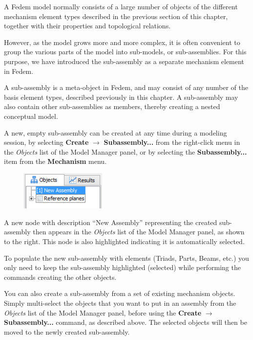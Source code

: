 
A Fedem model normally consists of a large number of objects of the
different mechanism element types described in the previous section of
this chapter, together with their properties and topological relations.

However, as the model grows more and more complex, it is often
convenient to group the various parts of the model into sub-models, or
sub-assemblies. For this purpose, we have introduced the sub-assembly as
a separate mechanism element in Fedem.

A sub-assembly is a meta-object in Fedem, and may consist of any number
of the basis element types, described previously in this chapter.
A sub-assembly may also contain other sub-assemblies as members,
thereby creating a nested conceptual model.



A new, empty sub-assembly can be created at any time during a modeling session,
by selecting \textbf{Create} $\rightarrow$ \textbf{Subassembly...} from the
right-click menu in the {\sl Objects} list of the Model Manager panel, or by
selecting the \textbf{Subassembly...} item from the \textbf{Mechanism} menu.

\begin{figure}
  \vspace{-4mm}
  \includegraphics[width=0.38\textwidth]{Figures/4-NewSubassembly}
\end{figure}

A new node with description ``New Assembly'' representing the created
sub-assembly then appears in the {\sl Objects} list of the Model Manager panel,
as shown to the right. This node is also highlighted indicating it is
automatically selected.

To populate the new sub-assembly with elements (Triads, Parts, Beams, etc.)
you only need to keep the sub-assembly highlighted (selected)
while performing the commands creating the other objects.

You can also create a sub-assembly from a set of existing mechanism objects.
Simply multi-select the objects that you want to put in an assembly from the
{\sl Objects} list of the Model Manager panel, before using the \textbf{Create}
$\rightarrow$ \textbf{Subassembly...} command, as described above.
The selected objects will then be moved to the newly created sub-assembly.


